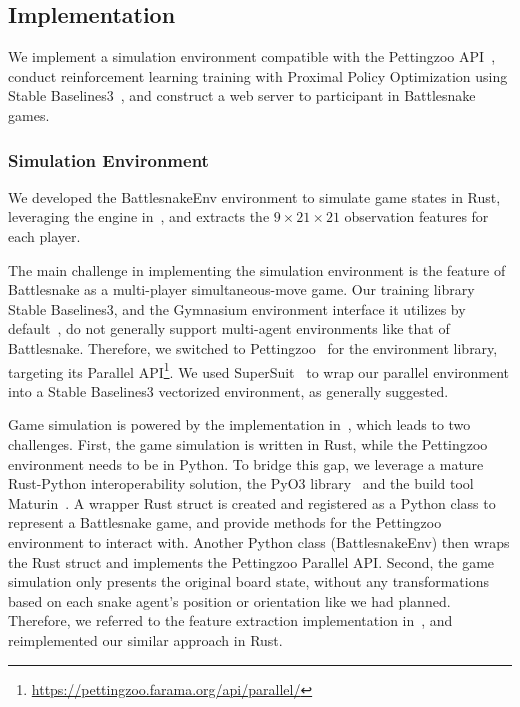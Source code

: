 \documentclass[conference]{IEEEtran}
\begin{document}
\subsection{Implementation}

We implement a simulation environment compatible with the Pettingzoo
API~\cite{terry2021pettingzoo},
conduct reinforcement learning training with Proximal Policy Optimization using
Stable Baselines3~\cite{raffin2024stable},
and construct a web server to participant in Battlesnake games.

\subsubsection{Simulation Environment}\label{sec:sim-env}

We developed the \textsf{BattlesnakeEnv} environment to simulate game states in Rust, leveraging the engine in~\cite{wrenger2024rusty},
and extracts the $9\times 21\times 21$ observation features for each player.

The main challenge in implementing the simulation environment is the feature of
Battlesnake as a multi-player simultaneous-move game.
Our training library Stable Baselines3,
and the Gymnasium environment interface it utilizes by
default~\cite{farama2024gymnasium},
do not generally support multi-agent environments like that of Battlesnake.
Therefore, we switched to Pettingzoo~\cite{terry2021pettingzoo}
for the environment library,
targeting its Parallel
API\footnote{\url{https://pettingzoo.farama.org/api/parallel/}}.
We used SuperSuit~\cite{SuperSuit}
to wrap our parallel environment into a Stable Baselines3 vectorized
environment, as generally suggested.

Game simulation is powered by the implementation in~\cite{wrenger2024rusty},
which leads to two challenges. First, the game simulation is written in Rust,
while the Pettingzoo environment needs to be in Python. To bridge this gap,
we leverage a mature Rust-Python interoperability solution,
the PyO3 library~\cite{pyo3} and the build tool Maturin~\cite{maturin}.
A wrapper Rust struct is created and registered as a Python class to represent a
Battlesnake game,
and provide methods for the Pettingzoo environment to interact with.
Another Python class (\textsf{BattlesnakeEnv})
then wraps the Rust struct and implements the Pettingzoo Parallel API. Second,
the game simulation only presents the original board state,
without any transformations based on each snake agent's position or orientation
like we had planned. Therefore,
we referred to the feature extraction implementation
in~\cite{siddiqui2020multiagent},
and reimplemented our similar approach in Rust.
\end{document}
